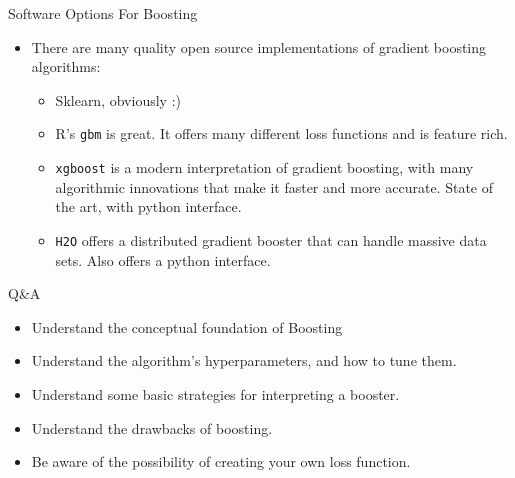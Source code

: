 \begin{frame}{Software Options For Boosting}

\begin{itemize}
  \item There are many quality open source implementations of gradient boosting algorithms:
  \begin{itemize}
    \item Sklearn, obviously :)
    \item R's \texttt{gbm} is great.  It offers many different loss functions
    and is feature rich.
    \item \texttt{xgboost} is a modern interpretation of gradient boosting, with
    many algorithmic innovations that make it faster and more accurate.  State of the art, with python interface.
    \item \texttt{H2O} offers a distributed gradient booster that can handle
    massive data sets.  Also offers a python interface.
  \end{itemize}
\end{itemize}

\end{frame}
%
\begin{frame}{Q\&A}
  \begin{itemize}
    \item Understand the conceptual foundation of Boosting
    \item Understand the algorithm's hyperparameters, and how to tune them.
    \item Understand some basic strategies for interpreting a booster.
    \item Understand the drawbacks of boosting.
    \item Be aware of the possibility of creating your own loss function.
  \end{itemize}
\end{frame}
